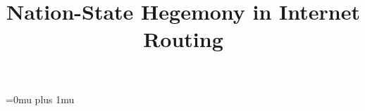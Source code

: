 \documentclass[sigconf]{acmart}
\title{Nation-State Hegemony in Internet Routing}
\def\plainkeywords{Authors' choice; of terms; separated; by
  semicolons; include commas, within terms only; required.}
\begin{document}



\maketitle


\begin{sloppypar}














\end{sloppypar}
\balance
\Urlmuskip=0mu plus 1mu\relax


\end{document}
